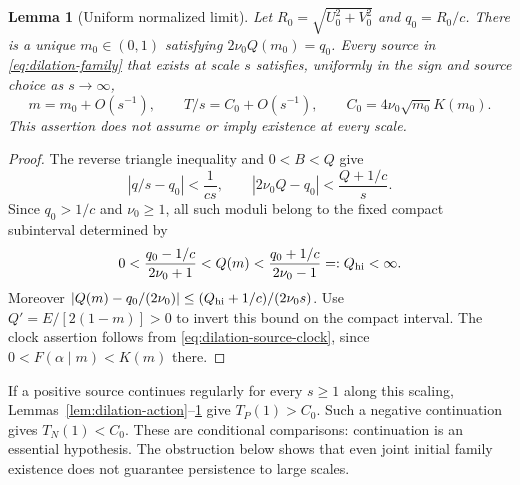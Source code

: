 \documentclass[11pt,a4paper]{article}
\newtheorem{lemma}[theorem]{Lemma}
\theoremstyle{remark}\newtheorem{remark}[theorem]{Remark}
\begin{document}
\begin{lemma}[Uniform normalized limit]
\label{lem:dilation-limit}
Let $R_0=\sqrt{U_0^2+V_0^2}$ and $q_0=R_0/c$. There is a unique
$m_0\in(0,1)$ satisfying $2\nu_0Q(m_0)=q_0$. Every source in
\eqref{eq:dilation-family} that exists at scale $s$ satisfies, uniformly
in the sign and source choice as $s\to\infty$,
\begin{equation}\label{eq:dilation-common-limit}
 m=m_0+O(s^{-1}),\qquad T/s=C_0+O(s^{-1}),\qquad
 C_0=4\nu_0\sqrt{m_0}K(m_0).
\end{equation}
This assertion does not assume or imply existence at every scale.
\end{lemma}
\begin{proof}
The reverse triangle inequality and $0<B<Q$ give
\[
 |q/s-q_0|<\frac1{cs},\qquad
 |2\nu_0Q-q_0|<\frac{Q+1/c}{s}.
\]
Since $q_0>1/c$ and $\nu_0\ge1$, all such moduli belong to the fixed
compact subinterval determined by
\[
 0<\frac{q_0-1/c}{2\nu_0+1}<Q(m)
 <\frac{q_0+1/c}{2\nu_0-1}=:Q_{\rm hi}<\infty.
\]
Moreover $|Q(m)-q_0/(2\nu_0)|\le(Q_{\rm hi}+1/c)/(2\nu_0s)$.
Use $Q'=E/[2(1-m)]>0$ to invert this bound on the compact interval.
The clock assertion follows from \eqref{eq:dilation-source-clock},
since $0<F(\alpha\mid m)<K(m)$ there.
\end{proof}

If a positive source continues regularly for every $s\ge1$ along this
scaling, Lemmas~\ref{lem:dilation-action}--\ref{lem:dilation-limit}
give $T_P(1)>C_0$. Such a negative continuation gives $T_N(1)<C_0$.
These are conditional comparisons: continuation is an essential hypothesis.
The obstruction below shows that even joint initial family existence
does not guarantee persistence to large scales.
\end{document}
